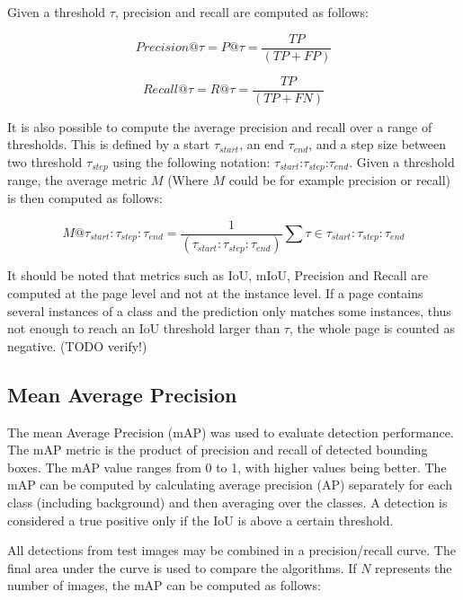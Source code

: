 \documentclass[english, bibtex]{kththesis}
\begin{document}
Given a threshold $\tau$, precision and recall are computed as follows:

\begin{equation}
	Precision @ \tau = P@\tau = \frac{TP}{(TP + FP)}
  	\label{eqn:precision}
\end{equation}

\begin{equation}
	Recall @ \tau = R@\tau = \frac{TP}{(TP + FN)}
  	\label{eqn:recall}
\end{equation}

It is also possible to compute the average precision and recall over a range of thresholds. This is defined by a start $\tau_{start}$, an end $\tau_{end}$, and a step size between two threshold $\tau_{step}$ using the following notation: $\tau_{start}$:$\tau_{step}$:$\tau_{end}$. Given a threshold range, the average metric $M$ (Where $M$ could be for example precision or recall) is then computed as follows:

\begin{equation}
M@\tau_{start}:\tau_{step}:\tau_{end} = \frac{1}{(\tau_{start}:\tau_{step}:\tau_{end})} \sum{} \tau \in \tau_{start}:\tau_{step}:\tau_{end}
    \label{eqn:rangem}
\end{equation}

It should be noted that metrics such as IoU, mIoU, Precision and Recall are computed at the page level and not at the instance level. If a page contains several instances of a class and the prediction only matches some instances, thus not enough to reach an IoU threshold larger than $\tau$, the whole page is counted as negative. (TODO verify!)


\subsection{Mean Average Precision}

The mean Average Precision (mAP) was used to evaluate detection performance. The mAP metric is the product of precision and recall of detected bounding boxes. The mAP value ranges from 0 to 1, with higher values being better. The mAP can be computed by calculating average precision (AP) separately for each class (including background) and then averaging over the classes. A detection is considered a true positive only if the IoU is above a certain threshold. 

All detections from test images may be combined in a precision/recall curve. The final area under the curve is used to compare the algorithms. If $N$ represents the number of images, the mAP can be computed as follows:
\end{document}
